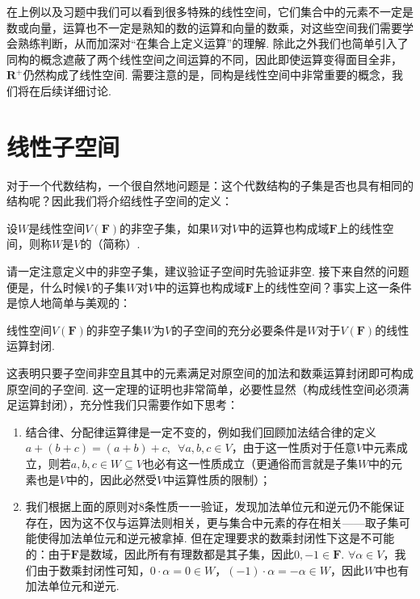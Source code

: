 在上例以及习题中我们可以看到很多特殊的线性空间，它们集合中的元素不一定是数或向量，运算也不一定是熟知的数的运算和向量的数乘，对这些空间我们需要学会熟练判断，从而加深对``在集合上定义运算''的理解. 除此之外我们也简单引入了同构的概念遮蔽了两个线性空间之间运算的不同，因此即使运算变得面目全非，$\mathbf{R}^+$仍然构成了线性空间. 需要注意的是，同构是线性空间中非常重要的概念，我们将在后续详细讨论.

\section{线性子空间}

对于一个代数结构，一个很自然地问题是：这个代数结构的子集是否也具有相同的结构呢？因此我们将介绍线性子空间的定义：
\begin{definition}[线性子空间] 
    设$W$是线性空间$V(\mathbf{F})$的非空子集，如果$W$对$V$中的运算也构成域$\mathbf{F}$上的线性空间，则称$W$是$V$的（简称）.
\end{definition}

请一定注意定义中的非空子集，建议验证子空间时先验证非空. 接下来自然的问题便是，什么时候$V$的子集$W$对$V$中的运算也构成域$\mathbf{F}$上的线性空间？事实上这一条件是惊人地简单与美观的：
\begin{theorem}\label{thm:2:子空间判别}
    线性空间$V(\mathbf{F})$的非空子集$W$为$V$的子空间的充分必要条件是$W$对于$V(\mathbf{F})$的线性运算封闭.
\end{theorem}

这表明只要子空间非空且其中的元素满足对原空间的加法和数乘运算封闭即可构成原空间的子空间. 这一定理的证明也非常简单，必要性显然（构成线性空间必须满足运算封闭），充分性我们只需要作如下思考：
\begin{enumerate}
    \item 结合律、分配律运算律是一定不变的，例如我们回顾加法结合律的定义$a+(b+c)=(a+b)+c,\enspace\forall a,b,c\in V$，由于这一性质对于任意$V$中元素成立，则若$a,b,c\in W\subseteq V$也必有这一性质成立（更通俗而言就是子集$W$中的元素也是$V$中的，因此必然受$V$中运算性质的限制）；

    \item 我们根据上面的原则对8条性质一一验证，发现加法单位元和逆元仍不能保证存在，因为这不仅与运算法则相关，更与集合中元素的存在相关——取子集可能使得加法单位元和逆元被拿掉. 但在定理要求的数乘封闭性下这是不可能的：由于$\mathbf{F}$是数域，因此所有有理数都是其子集，因此$0,-1\in\mathbf{F}$. $\forall \alpha\in V$，我们由于数乘封闭性可知，$0\cdot\alpha=0\in W$，$(-1)\cdot\alpha=-\alpha\in W$，因此$W$中也有加法单位元和逆元.
\end{enumerate}

